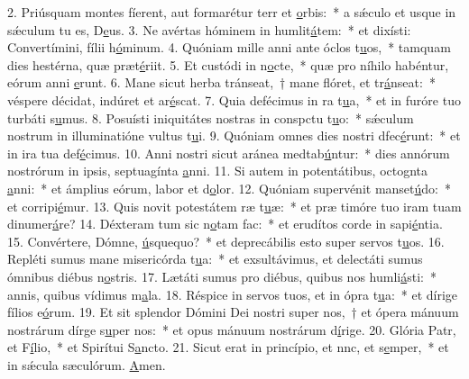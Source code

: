 2. Priúsquam montes fíerent, aut formarétur terr et \uline{o}rbis:~* a sǽculo et usque in sǽculum tu es, D\uline{e}us.
3. Ne avértas hóminem in humlit\uline{á}tem:~* et dixísti: Convertímini, fílii h\uline{ó}minum.
4. Quóniam mille anni ante óclos t\uline{u}os,~* tamquam dies hestérna, quæ præt\uline{é}riit.
5. Et custódi in n\uline{o}cte,~* quæ pro níhilo habéntur, eórum anni \uline{e}runt.
6. Mane sicut herba tránseat,~† mane flóret, et tr\uline{á}nseat:~* véspere décidat, indúret et ar\uline{é}scat.
7. Quia defécimus in ra t\uline{u}a,~* et in furóre tuo turbáti s\uline{u}mus.
8. Posuísti iniquitátes nostras in conspctu t\uline{u}o:~* sǽculum nostrum in illuminatióne vultus t\uline{u}i.
9. Quóniam omnes dies nostri dfec\uline{é}runt:~* et in ira tua def\uline{é}cimus.
10. Anni nostri sicut aránea medtab\uline{ú}ntur:~* dies annórum nostrórum in ipsis, septuagínta \uline{a}nni.
11. Si autem in potentátibus, octognta \uline{a}nni:~* et ámplius eórum, labor et d\uline{o}lor.
12. Quóniam supervénit manset\uline{ú}do:~* et corripi\uline{é}mur.
13. Quis novit potestátem ræ t\uline{u}æ:~* et præ timóre tuo iram tuam dinumer\uline{á}re?
14. Déxteram tum sic n\uline{o}tam fac:~* et erudítos corde in sapi\uline{é}ntia.
15. Convértere, Dómne, \uline{ú}squequo?~* et deprecábilis esto super servos t\uline{u}os.
16. Repléti sumus mane misericórda t\uline{u}a:~* et exsultávimus, et delectáti sumus ómnibus diébus n\uline{o}stris.
17. Lætáti sumus pro diébus, quibus nos humli\uline{á}sti:~* annis, quibus vídimus m\uline{a}la.
18. Réspice in servos tuos, et in ópra t\uline{u}a:~* et dírige fílios e\uline{ó}rum.
19. Et sit splendor Dómini Dei nostri super nos,~† et ópera mánuum nostrárum dírge s\uline{u}per nos:~* et opus mánuum nostrárum d\uline{í}rige.
20. Glória Patr, et F\uline{í}lio,~* et Spirítui S\uline{a}ncto.
21. Sicut erat in princípio, et nnc, et s\uline{e}mper,~* et in sǽcula sæculórum. \uline{A}men.
